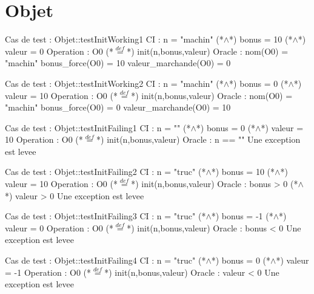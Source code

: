 \documentclass[a4paper, 11pt, notitlepage]{report}
\begin{document}
\section*{Objet}
\begin{Test}

Cas de test  : Objet::testInitWorking1
CI : n = "machin" (*$\land$*) bonus = 10 (*$\land$*) valeur = 0
Operation : O0 (*$\stackrel{def}{=}$*) init(n,bonus,valeur)
Oracle :
	nom(O0) = "machin"
	bonus\_force(O0) = 10
	valeur\_marchande(O0) = 0
	
Cas de test  : Objet::testInitWorking2
CI : n = "machin" (*$\land$*) bonus = 0 (*$\land$*) valeur = 10
Operation : O0 (*$\stackrel{def}{=}$*) init(n,bonus,valeur)
Oracle :
	nom(O0) = "machin"
	bonus\_force(O0) = 0
	valeur\_marchande(O0) = 10
	
Cas de test  : Objet::testInitFailing1
CI : n = "" (*$\land$*) bonus = 0 (*$\land$*) valeur = 10
Operation : O0 (*$\stackrel{def}{=}$*) init(n,bonus,valeur)
Oracle :
	n == ""
	Une exception est levee
	
Cas de test  : Objet::testInitFailing2
CI : n = "truc" (*$\land$*) bonus = 10 (*$\land$*) valeur = 10
Operation : O0 (*$\stackrel{def}{=}$*) init(n,bonus,valeur)
Oracle :
	bonus > 0 (*$\land$*) valeur > 0
	Une exception est levee
	
Cas de test  : Objet::testInitFailing3
CI : n = "truc" (*$\land$*) bonus = -1 (*$\land$*) valeur = 0
Operation : O0 (*$\stackrel{def}{=}$*) init(n,bonus,valeur)
Oracle :
	bonus < 0
	Une exception est levee
	
Cas de test  : Objet::testInitFailing4
CI : n = "truc" (*$\land$*) bonus = 0 (*$\land$*) valeur = -1
Operation : O0 (*$\stackrel{def}{=}$*) init(n,bonus,valeur)
Oracle :
	valeur < 0
	Une exception est levee


\end{Test}
\end{document}
